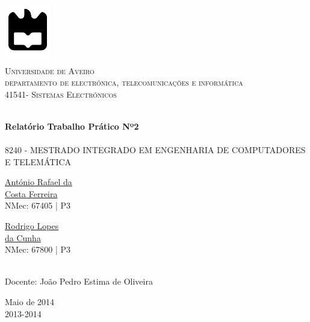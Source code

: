 \begin{titlepage}

\begin{center}

\includegraphics[width=0.15\textwidth]{./logo}\\[0.5cm]    

\textsc{\large Universidade de Aveiro \\[1cm]\large departamento de electrónica, telecomunicações e informática}\\[1cm]

\textsc{\large{41541}\large - Sistemas Electrónicos \\[1cm]}

\HRule \\[0.5cm]
{ \huge \bfseries Relatório Trabalho Prático Nº2}\\[0.4cm]
\HRule \\[1cm]

\textsc{\small{8240 - MESTRADO INTEGRADO EM ENGENHARIA DE COMPUTADORES E TELEMÁTICA}}\\[1cm]

\begin{minipage}{0.4\textwidth}

\begin{flushleft} \large
\href{mailto:rafael.ferreira@ua.pt}{António Rafael da \\ Costa Ferreira }
 \small{\\NMec: 67405 | P3}
\end{flushleft}
\end{minipage}
\begin{minipage}{0.4\textwidth}

\begin{flushright} \large
\href{mailto:rodrigocunha@ua.pt}{Rodrigo Lopes \\ da Cunha}
\small{\\NMec: 67800 | P3}
\end{flushright}
\end{minipage}\\[1cm]

{\large Docente:  João Pedro Estima de Oliveira  }\\[0.5cm]

\vfill

{\large Maio de 2014 \\ 2013-2014}

\end{center}

\end{titlepage}